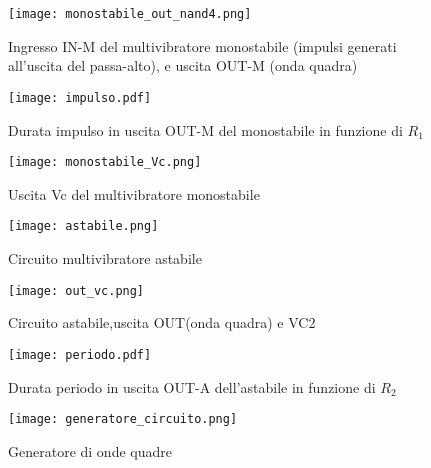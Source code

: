 \begin{figure}[h]
	\centering
	\texttt{[image: monostabile\_out\_nand4.png]}
	\caption{Ingresso IN-M del multivibratore monostabile (impulsi generati all'uscita del passa-alto), e uscita OUT-M (onda quadra) }
	\label{f:monostabile_out_nand4}
\end{figure}

\begin{figure}[h]
	\centering
	\texttt{[image: impulso.pdf]}
	\caption{Durata impulso in uscita OUT-M del monostabile in funzione di $R_{1}$}
	\label{f:impulso}
\end{figure}
	
\begin{figure}[h]
	\centering
	\texttt{[image: monostabile\_Vc.png]}
	\caption{Uscita Vc del multivibratore monostabile}
	\label{f:monostabile_Vc}
\end{figure}

\begin{figure}[h]
	\centering
	\texttt{[image: astabile.png]}
	\caption{Circuito multivibratore astabile}
	\label{f:astabile}
\end{figure}

\begin{figure}[h]
	\centering
	\texttt{[image: out\_vc.png]}
	\caption{Circuito astabile,uscita OUT(onda quadra) e VC2}
	\label{f:astabile_out_vc}
\end{figure}

\begin{figure}[h]
	\centering
	\texttt{[image: periodo.pdf]}
	\caption{Durata periodo in uscita OUT-A dell'astabile in funzione di $R_{2}$}
	\label{f:periodo}
\end{figure}

\begin{figure}[h]
	\centering
	\texttt{[image: generatore\_circuito.png]}
	\caption{Generatore di onde quadre}
	\label{f:generatore_circuito}
\end{figure}

